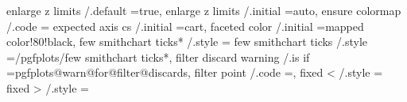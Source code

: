 {{{{{{{{{{{{enlarge z limits                             /.default                                                                                 =true,                                                                                                              
enlarge z limits                             /.initial                                                                                 =auto,                                                                                                              
ensure colormap                              /.code                                                                                    ={%
expected axis cs                             /.initial                                                                                 =cart,                                                                                                              
faceted color                                /.initial                                                                                 =mapped color!80!black,                                                                                             
few smithchart ticks*                        /.style                                                                                   ={                                                                                                                  
few smithchart ticks                         /.style                                                                                   ={/pgfplots/few smithchart ticks*},                                                                                 
filter discard warning                       /.is if                                                                                   =pgfplots@warn@for@filter@discards,                                                                                 
filter point                                 /.code                                                                                    =,                                                                                                                  
fixed <                                      /.style                                                                                   ={%
fixed >                                      /.style                                                                                   ={%
}}}}}}}}}}}}}}}}
